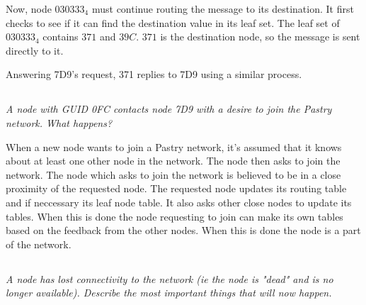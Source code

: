 \documentclass{article}
\newcommand{\question}[1]{\subsection{}\textit{#1}\bigskip}
\begin{document}
Now, node $ 030333_4 $ must continue routing the message to its destination.
It first checks to see if it can find the destination value in its leaf set.
The leaf set of $ 030333_4 $ contains $ 371 $ and $ 39C $.
$ 371 $ is the destination node, so the message is sent directly to it.

Answering 7D9's request, 371 replies to 7D9 using a similar process.


\question{A node with GUID 0FC contacts node 7D9 with a desire to join the Pastry network. What happens?}

When a new node wants to join a Pastry network, it's assumed that it knows about at least one other node in the network. The node then asks to join the network.
The node which asks to join the network is believed to be in a close proximity of the requested node.
The requested node updates its routing table and if neccessary its leaf node table. It also asks other close nodes to update its tables.
When this is done the node requesting to join can make its own tables based on the feedback from the other nodes.
When this is done the node is a part of the network.

\question{A node has lost connectivity to the network (ie the node is "dead" and is no longer available). Describe the most important things that will now happen.}
\end{document}
